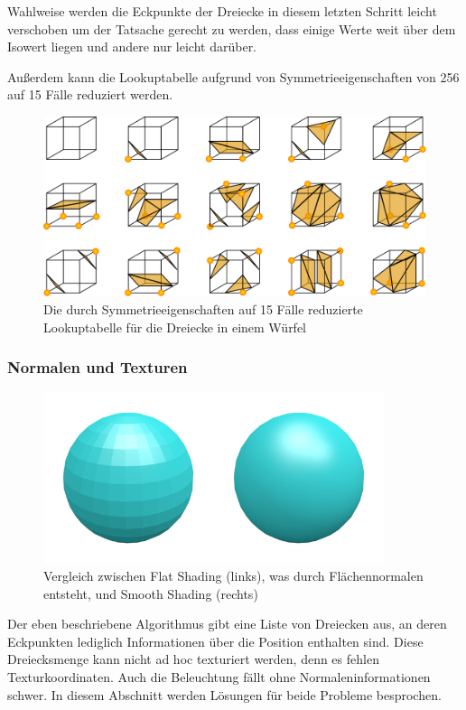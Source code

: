 Wahlweise werden die Eckpunkte der Dreiecke in diesem letzten Schritt
leicht verschoben um der Tatsache gerecht zu werden, dass einige Werte
\Pimiddyggf weit über dem Isowert liegen und andere nur leicht
darüber.

Außerdem kann die Lookuptabelle aufgrund von Symmetrieeigenschaften
von 256 auf 15 Fälle reduziert werden.

\begin{figure}[h]
\centering
\includegraphics[width=12cm]{images/marching_cubes_combinations}
\caption{Die durch Symmetrieeigenschaften auf 15 Fälle reduzierte Lookuptabelle für die Dreiecke in einem Würfel}
\label{fig:implementation_fallen_snow_marching_cubes_combinations}
\end{figure}

\subsubsection{Normalen und Texturen}

\begin{figure}[h]
\centering
\includegraphics[width=10cm]{images/shading_comparison}
\caption{Vergleich zwischen Flat Shading (links), was durch Flächennormalen entsteht, und Smooth Shading (rechts)}
\label{fig:implementation_fallen_snow_shading_comparison}
\end{figure}

Der eben beschriebene Algorithmus gibt eine Liste von Dreiecken aus,
an deren Eckpunkten lediglich Informationen über die Position
enthalten sind. Diese Dreiecksmenge kann nicht ad hoc texturiert
werden, denn es fehlen Texturkoordinaten. Auch die Beleuchtung fällt
ohne Normaleninformationen schwer. In diesem Abschnitt werden Lösungen
für beide Probleme besprochen.

